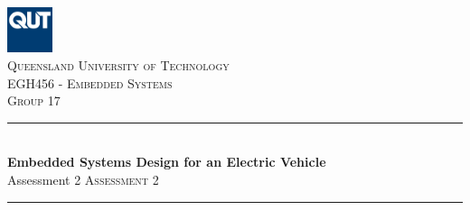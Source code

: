 \documentclass[a4paper, 11pt, titlepage]{article}
\title{\reporttitle}
\author{\authorname}
\def\majorheading{EGH456 - Embedded Systems} %
\def\minorheading{Group 17} %
\def\reporttitle{Embedded Systems Design for an Electric Vehicle} %
\def\reportsubtitle{Assessment 2} %
\def\institutionname{Queensland University of Technology}
\begin{document}
\begin{titlepage} %
\newcommand{\HRule}{\rule{\linewidth}{0.5mm}} %

\center %

\vfill\vfill
\includegraphics[width=0.1\textwidth]{images/qut-logo.jpg}\\[1cm] %


\textsc{\LARGE \institutionname}\\[1.5cm] %

\textsc{\Large \majorheading}\\[0.5cm] %

\textsc{\large \minorheading}\\[0.5cm] %


\HRule\\[0.8cm]

{\huge\bfseries \reporttitle}\\[0.4cm] %
\ifx\reportsubtitle\undefined 
\else
    {\textsc{\Large \reportsubtitle}}\\[0.4cm] %
\fi

\HRule\\[0.5cm]


\theauthor[0.4cm]



\end{titlepage}
\end{document}

